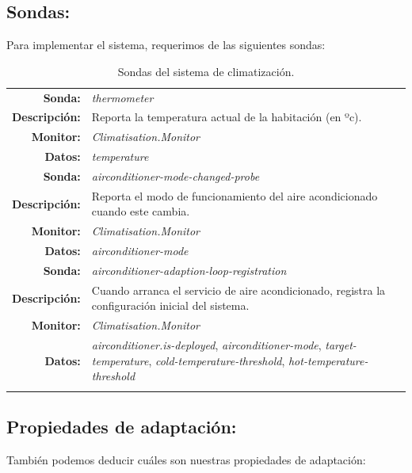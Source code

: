 \subsection{Sondas:}

Para implementar el sistema, requerimos de las siguientes sondas:

\begin{longtable}{|r p{11.5cm}|}
    \hline
    \textbf{Sonda:} & \emph{thermometer}  \\
    \textbf{Descripción:} & Reporta la temperatura actual de la habitación (en ºc). \\
    \textbf{Monitor:} & \emph{Climatisation.Monitor} \\
    \textbf{Datos:} & \emph{temperature} \\
    \hline
    \textbf{Sonda:} & \emph{airconditioner-mode-changed-probe}  \\
    \textbf{Descripción:} & Reporta el modo de funcionamiento del aire acondicionado cuando este cambia. \\
    \textbf{Monitor:} & \emph{Climatisation.Monitor} \\
    \textbf{Datos:} & \emph{airconditioner-mode} \\
    \hline
    \textbf{Sonda:} & \emph{airconditioner-adaption-loop-registration}  \\
    \textbf{Descripción:} & Cuando arranca el servicio de aire acondicionado, registra la configuración inicial del sistema. \\
    \textbf{Monitor:} & \emph{Climatisation.Monitor} \\
    \textbf{Datos:} & \emph{airconditioner.is-deployed}, \emph{airconditioner-mode}, \emph{target-temperature}, \emph{cold-temperature-threshold}, \emph{hot-temperature-threshold} \\
    \hline

    \caption{Sondas del sistema de climatización.}
    \label{tab:climatisation-probes}
\end{longtable}

\subsection{Propiedades de adaptación:}

También podemos deducir cuáles son nuestras propiedades de adaptación:

